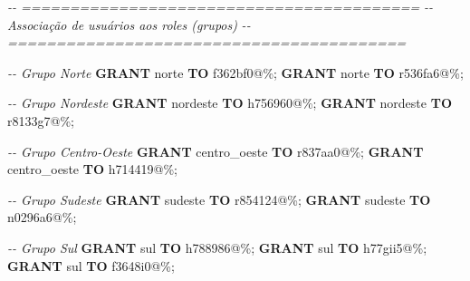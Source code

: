\documentclass[
]{book}
\newenvironment{Shaded}{\begin{snugshade}}{\end{snugshade}}
\newcommand{\CommentTok}[1]{\textcolor[rgb]{0.56,0.35,0.01}{\textit{#1}}}
\newcommand{\KeywordTok}[1]{\textcolor[rgb]{0.13,0.29,0.53}{\textbf{#1}}}
\newcommand{\NormalTok}[1]{#1}
\newcommand{\StringTok}[1]{\textcolor[rgb]{0.31,0.60,0.02}{#1}}
\begin{document}
\begin{Shaded}
\begin{Highlighting}[]
\CommentTok{{-}{-} =========================================}
\CommentTok{{-}{-} Associação de usuários aos roles (grupos)}
\CommentTok{{-}{-} =========================================}

\CommentTok{{-}{-} Grupo Norte}
\KeywordTok{GRANT} \StringTok{\textquotesingle{}norte\textquotesingle{}} \KeywordTok{TO} \StringTok{\textquotesingle{}f362bf0\textquotesingle{}}\NormalTok{@}\StringTok{\textquotesingle{}\%\textquotesingle{}}\NormalTok{;}
\KeywordTok{GRANT} \StringTok{\textquotesingle{}norte\textquotesingle{}} \KeywordTok{TO} \StringTok{\textquotesingle{}r536fa6\textquotesingle{}}\NormalTok{@}\StringTok{\textquotesingle{}\%\textquotesingle{}}\NormalTok{;}

\CommentTok{{-}{-} Grupo Nordeste}
\KeywordTok{GRANT} \StringTok{\textquotesingle{}nordeste\textquotesingle{}} \KeywordTok{TO} \StringTok{\textquotesingle{}h756960\textquotesingle{}}\NormalTok{@}\StringTok{\textquotesingle{}\%\textquotesingle{}}\NormalTok{;}
\KeywordTok{GRANT} \StringTok{\textquotesingle{}nordeste\textquotesingle{}} \KeywordTok{TO} \StringTok{\textquotesingle{}r8133g7\textquotesingle{}}\NormalTok{@}\StringTok{\textquotesingle{}\%\textquotesingle{}}\NormalTok{;}

\CommentTok{{-}{-} Grupo Centro{-}Oeste}
\KeywordTok{GRANT} \StringTok{\textquotesingle{}centro\_oeste\textquotesingle{}} \KeywordTok{TO} \StringTok{\textquotesingle{}r837aa0\textquotesingle{}}\NormalTok{@}\StringTok{\textquotesingle{}\%\textquotesingle{}}\NormalTok{;}
\KeywordTok{GRANT} \StringTok{\textquotesingle{}centro\_oeste\textquotesingle{}} \KeywordTok{TO} \StringTok{\textquotesingle{}h714419\textquotesingle{}}\NormalTok{@}\StringTok{\textquotesingle{}\%\textquotesingle{}}\NormalTok{;}

\CommentTok{{-}{-} Grupo Sudeste}
\KeywordTok{GRANT} \StringTok{\textquotesingle{}sudeste\textquotesingle{}} \KeywordTok{TO} \StringTok{\textquotesingle{}r854124\textquotesingle{}}\NormalTok{@}\StringTok{\textquotesingle{}\%\textquotesingle{}}\NormalTok{;}
\KeywordTok{GRANT} \StringTok{\textquotesingle{}sudeste\textquotesingle{}} \KeywordTok{TO} \StringTok{\textquotesingle{}n0296a6\textquotesingle{}}\NormalTok{@}\StringTok{\textquotesingle{}\%\textquotesingle{}}\NormalTok{;}

\CommentTok{{-}{-} Grupo Sul}
\KeywordTok{GRANT} \StringTok{\textquotesingle{}sul\textquotesingle{}} \KeywordTok{TO} \StringTok{\textquotesingle{}h788986\textquotesingle{}}\NormalTok{@}\StringTok{\textquotesingle{}\%\textquotesingle{}}\NormalTok{;}
\KeywordTok{GRANT} \StringTok{\textquotesingle{}sul\textquotesingle{}} \KeywordTok{TO} \StringTok{\textquotesingle{}h77gii5\textquotesingle{}}\NormalTok{@}\StringTok{\textquotesingle{}\%\textquotesingle{}}\NormalTok{;}
\KeywordTok{GRANT} \StringTok{\textquotesingle{}sul\textquotesingle{}} \KeywordTok{TO} \StringTok{\textquotesingle{}f3648i0\textquotesingle{}}\NormalTok{@}\StringTok{\textquotesingle{}\%\textquotesingle{}}\NormalTok{;}


\end{Highlighting}
\end{Shaded}
\end{document}
